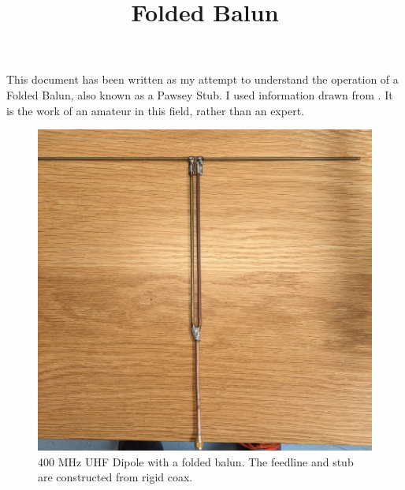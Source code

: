 \documentclass{article}
\begin{document}
\title{Folded Balun}
\maketitle

This document has been written as my attempt to understand the operation of a Folded Balun, also known as a Pawsey Stub.  I used information drawn from \cite{stack_exchange}\cite{antenna_theory}\cite{duffey}.  It is the work of an amateur in this field, rather than an expert.

\begin{figure}[h]
\caption{400 MHz UHF Dipole with a folded balun. The feedline and stub are constructed from rigid coax.}
\label{fig:uhf_diople}
\begin{center}
\includegraphics{uhf_dipole.jpg}
\end{center}
\end{figure}
\end{document}
